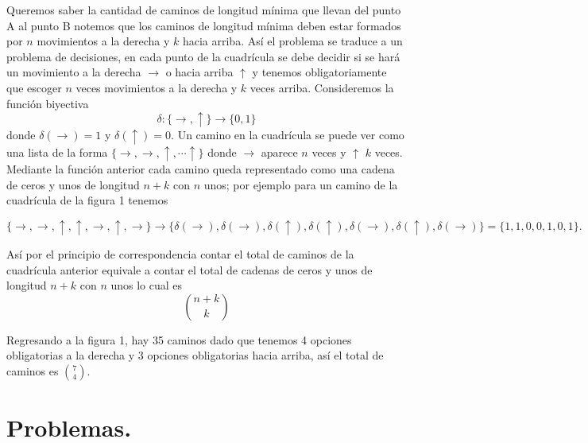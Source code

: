 Queremos saber la cantidad de caminos de longitud mínima que llevan del punto A al punto B notemos que los caminos de longitud mínima deben estar formados por $n$ movimientos a la derecha y $k$ hacia arriba. Así el problema se traduce a un problema de decisiones, en cada punto de la cuadrícula se debe decidir si se hará un movimiento a la derecha $\rightarrow$ o hacia arriba $\uparrow$ y tenemos obligatoriamente que escoger $n$ veces movimientos a la derecha y $k$ veces arriba. Consideremos la función biyectiva $$\delta : \{ \rightarrow, \uparrow\} \longrightarrow \{0,1\}$$ donde $\delta(\rightarrow)=1$ y $\delta(\uparrow)=0$. Un camino en la cuadrícula se puede ver como una lista de la forma $\{ \rightarrow, \rightarrow, \uparrow, \cdots \uparrow\}$ donde $\rightarrow$ aparece $n$ veces y $\uparrow$ $k$ veces. Mediante la función anterior cada camino queda representado como una cadena de ceros y unos de longitud $n+k$ con $n$ unos; por ejemplo para un camino de la cuadrícula de la figura 1 tenemos

$$\{ \rightarrow, \rightarrow, \uparrow, \uparrow, \rightarrow, \uparrow, \rightarrow\}\longrightarrow \{ \delta(\rightarrow), \delta(\rightarrow), \delta(\uparrow), \delta(\uparrow), \delta(\rightarrow), \delta(\uparrow), \delta(\rightarrow)\}=\{1,1,0,0,1,0,1\}.$$

Así por el principio de correspondencia contar el total de caminos de la cuadrícula anterior equivale a contar el total de cadenas de ceros y unos de longitud $n+k$ con $n$ unos lo cual es $$\binom{n+k}{k}$$


Regresando a la figura 1, hay 35 caminos dado que tenemos 4 opciones obligatorias a la derecha y 3 opciones obligatorias hacia arriba, así el total de caminos es $\displaystyle\binom{7}{4}$. 



\section{Problemas.}


